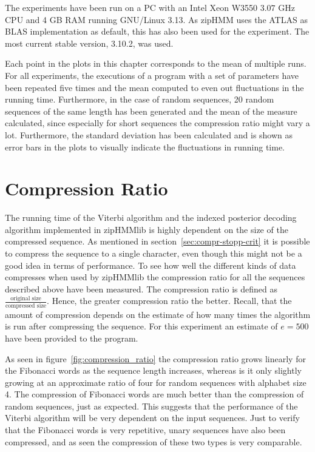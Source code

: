 The experiments have been run on a PC with an Intel Xeon W3550 $3.07$ GHz CPU
and 4 GB RAM running GNU/Linux 3.13. As zipHMM uses the ATLAS as BLAS
implementation as default, this has also been used for the experiment. The most
current stable version, 3.10.2, was used.

Each point in the plots in this chapter corresponds to the mean of multiple
runs. For all experiments, the executions of a program with a set of parameters
have been repeated five times and the mean computed to even out fluctuations in
the running time. Furthermore, in the case of random sequences, 20 random
sequences of the same length has been generated and the mean of the measure
calculated, since especially for short sequences the compression ratio might vary
a lot. Furthermore, the standard deviation has been calculated and is shown as
error bars in the plots to visually indicate the fluctuations in running time.

\section{Compression Ratio}
\label{sec:compression-ratio}

The running time of the Viterbi algorithm and the indexed posterior decoding
algorithm implemented in zipHMMlib is highly
dependent on the size of the compressed sequence. As mentioned in
section~\ref{sec:compr-stopp-crit} it is possible to compress the sequence to a
single character, even though this might not be a good idea in terms of
performance. To see how well the different kinds of data compresses when used
by zipHMMlib the compression ratio for all the sequences described above have
been measured. The compression ratio is defined as
$\frac{\text{original size}}{\text{compressed size}}$. Hence, the greater
compression ratio the better. Recall, that the amount of compression depends on
the estimate of how many times the algorithm is run after compressing the
sequence. For this experiment an estimate of $e = 500$ have been provided to
the program.

As seen in figure~\ref{fig:compression_ratio} the compression ratio grows
linearly for the Fibonacci words as the sequence length increases, whereas is
it only slightly growing at an approximate ratio of four for random
sequences with alphabet size 4. The compression of Fibonacci words are much
better than the compression of random sequences, just as expected. This
suggests that the performance of the Viterbi algorithm will be very dependent
on the input sequences. Just to verify that the Fibonacci words is very
repetitive, unary sequences have also been compressed, and as seen the
compression of these two types is very comparable.

